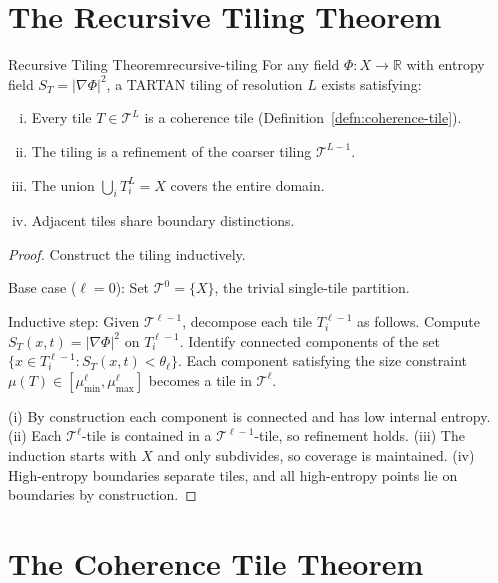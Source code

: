 \documentclass[12pt,twoside,openright]{book}
\begin{document}
\section{The Recursive Tiling Theorem}

\begin{theorem}{Recursive Tiling Theorem}{recursive-tiling}
  For any field $\Phi: X \to \mathbb{R}$ with entropy
  field $S_T = |\nabla \Phi|^2$, a TARTAN tiling of
  resolution $L$ exists satisfying:
  \begin{enumerate}[(i)]
    \item Every tile $T \in \mathcal{T}^L$ is a coherence
          tile (Definition~\ref{defn:coherence-tile}).
    \item The tiling is a refinement of the coarser
          tiling $\mathcal{T}^{L-1}$.
    \item The union $\bigcup_i T^L_i = X$ covers the
          entire domain.
    \item Adjacent tiles share boundary distinctions.
  \end{enumerate}
\end{theorem}

\begin{proof}
  Construct the tiling inductively.

  Base case ($\ell = 0$): Set $\mathcal{T}^0 = \{X\}$,
  the trivial single-tile partition.

  Inductive step: Given $\mathcal{T}^{\ell-1}$, decompose
  each tile $T^{\ell-1}_i$ as follows.
  Compute $S_T(x,t) = |\nabla\Phi|^2$ on $T^{\ell-1}_i$.
  Identify connected components of the set
  $\{x \in T^{\ell-1}_i : S_T(x,t) < \theta_\ell\}$.
  Each component satisfying the size constraint
  $\mu(T) \in [\mu_{\min}^\ell, \mu_{\max}^\ell]$
  becomes a tile in $\mathcal{T}^\ell$.

  (i) By construction each component is connected and
  has low internal entropy.
  (ii) Each $\mathcal{T}^\ell$-tile is contained in a
  $\mathcal{T}^{\ell-1}$-tile, so refinement holds.
  (iii) The induction starts with $X$ and only subdivides,
  so coverage is maintained.
  (iv) High-entropy boundaries separate tiles, and all
  high-entropy points lie on boundaries by construction.
\end{proof}

\section{The Coherence Tile Theorem}
\end{document}
